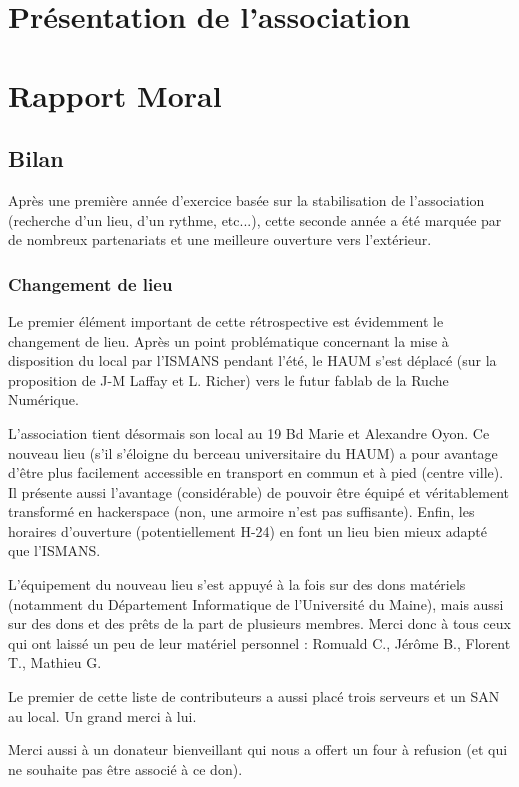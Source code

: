 \documentclass[11pt]{article}
\begin{document}
\section{Présentation de l'association}
\section{Rapport Moral}


\subsection{Bilan}

Après une première année d'exercice basée sur la stabilisation de l'association (recherche d'un lieu, d'un rythme, etc...), cette seconde année a été marquée par de nombreux partenariats et une meilleure ouverture vers l'extérieur.

\subsubsection{Changement de lieu}

Le premier élément important de cette rétrospective est évidemment le changement de lieu.
Après un point problématique concernant la mise à disposition du local par l'ISMANS pendant l'été, le HAUM s'est déplacé (sur la proposition de J-M Laffay et L. Richer) vers le futur fablab de la Ruche Numérique.

L'association tient désormais son local au 19 Bd Marie et Alexandre Oyon. Ce nouveau lieu (s'il s'éloigne du berceau universitaire du HAUM) a pour avantage d'être plus facilement accessible en transport en commun et à pied (centre ville). Il présente aussi l'avantage (considérable) de pouvoir être équipé et véritablement transformé en hackerspace (non, une armoire n'est pas suffisante). Enfin, les horaires d'ouverture (potentiellement H-24) en font un lieu bien mieux adapté que l'ISMANS.

L'équipement du nouveau lieu s'est appuyé à la fois sur des dons matériels (notamment du Département Informatique de l'Université du Maine), mais aussi sur des dons et des prêts de la part de plusieurs membres. Merci donc à tous ceux qui ont laissé un peu de leur matériel personnel : Romuald C., Jérôme B., Florent T., Mathieu G.

Le premier de cette liste de contributeurs a aussi placé trois serveurs et un SAN au local. Un grand merci à lui.

Merci aussi à un donateur bienveillant qui nous a offert un four à refusion (et qui ne souhaite pas être associé à ce don).
\end{document}
